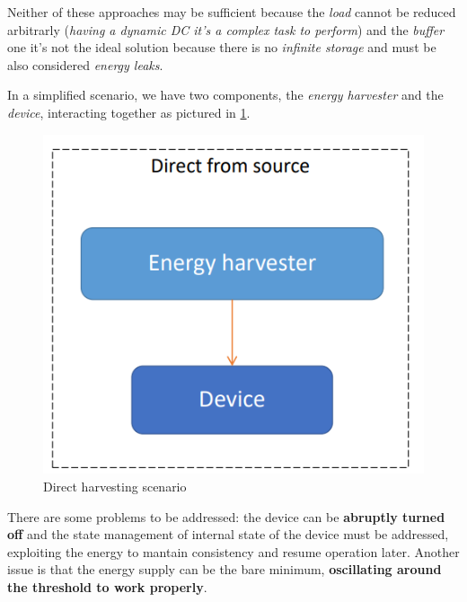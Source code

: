 \documentclass[10pt,a4paper]{report}
\theoremstyle{definition}
\begin{document}
Neither of these approaches may be sufficient because the \textit{load} cannot be reduced arbitrarly (\textit{having a dynamic DC it's a complex task to perform}) and the \textit{buffer} one it's not the ideal solution because there is no \textit{infinite storage} and must be also considered \textit{energy leaks}.

In a simplified scenario, we have two components, the \textit{energy harvester} and the \textit{device}, interacting together as pictured in \ref{base-harvest}.
\begin{figure}[h]
	\centering\includegraphics[scale=0.30]{images/Pasted image 20230424163213.png}
	\caption{Direct harvesting scenario}
	\label{base-harvest}
\end{figure}

There are some problems to be addressed: the device can be \textbf{abruptly turned off} and the state management of internal state of the device must be addressed, exploiting the energy to mantain consistency and resume operation later. Another issue is that the energy supply can be the bare minimum, \textbf{oscillating around the threshold to work properly}.
\end{document}
